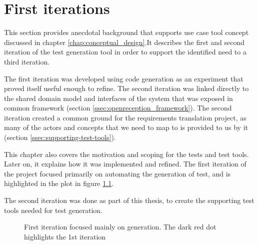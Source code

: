 \chapter{First iterations}

This section provides anecdotal background that supports use case tool concept discussed in chapter \ref{chap:conceptual_design}.It describes the first and second iteration of the test generation tool in order to support the identified need to a third iteration.\medskip

\noindent The first iteration was developed using code generation as an experiment that proved itself useful enough to refine. The second iteration was linked directly to the shared domain model and interfaces of the system that was exposed in common framework (section \ref{ssec:openreception_framework}). The second iteration created a common ground for the requirements translation project, as many of the actors and concepts that we need to map to is provided to us by it (section \ref{ssec:supporting-test-tools}).\medskip

\noindent This chapter also covers the motivation and scoping for the tests and test tools. Later on, it explains how it was implemented and refined. The first iteration of the project focused primarily on automating the generation of test, and is highlighted in the plot in figure \ref{fig:project_parameter_plot_1st_iteration}.\medskip

\noindent The second iteration was done as part of this thesis, to create the supporting test tools needed for test generation.
\begin{figure}[!htbp]
\centering
{}
\caption{First iteration focused mainly on generation. The dark red dot highlights the 1st iteration}
\label{fig:project_parameter_plot_1st_iteration}
\end{figure}

